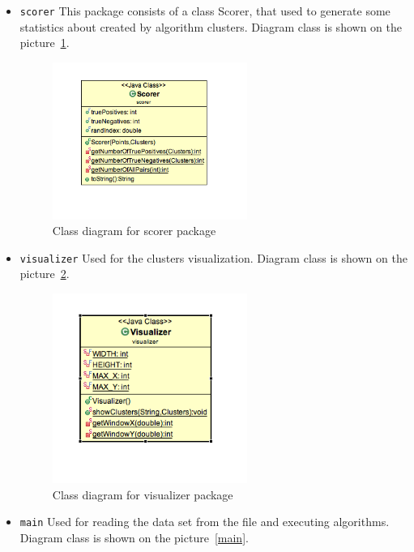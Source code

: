 \documentclass[12pt, a4paper, notitlepage, oneside]{article}
\begin{document}
\begin{itemize}
	\item \texttt{scorer} This package consists of a class Scorer, that used to generate some statistics about created by algorithm clusters. Diagram class is shown on the picture~\ref{scorer}.

	\begin{figure}[!ht]
 	\centering
	\includegraphics[width=0.6\textwidth]{images/scorer_package.png}
 	\caption[]
	{Class diagram for scorer package}
	\label{scorer}
	\end{figure}


	\item \texttt{visualizer} Used for the clusters visualization. Diagram class is shown on the picture~\ref{visualizer}.

	\begin{figure}[!ht]
 	\centering
	\includegraphics[width=0.6\textwidth]{images/visualizer_package.png}
 	\caption[]
	{Class diagram for visualizer package}
\label{visualizer}
	\end{figure}


	\item \texttt{main} Used for reading the data set from the file and executing algorithms. Diagram class is shown on the picture~\ref{main}.



\end{itemize}
\end{document}
